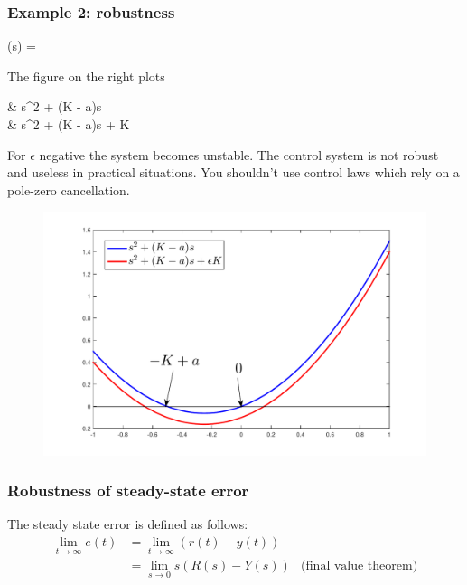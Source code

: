 \begin{frame}
	\frametitle{Example 2: robustness}
	\begin{minipage}{0.5\linewidth}
		\begin{flalign*}
			(s) = 
		\end{flalign*}
		The figure on the right plots
		\begin{flalign*}
			&{\color{blue} s^2 + (K - a)s} \\
			&{\color{red} s^2 + (K - a)s + \epsilon K}
		\end{flalign*}
		For $\epsilon$ negative the system becomes unstable. The control system is not robust and useless in practical situations. You shouldn’t use control laws which rely on a pole-zero cancellation. 
	\end{minipage}
	\begin{minipage}{0.4\linewidth}
		\begin{figure}
			\center
			\includegraphics[width=1.5\linewidth]{robustnessexample}
			\label{fig:robustness-example}
		\end{figure}
	\end{minipage}
\end{frame}


\begin{frame}
	\frametitle{Robustness of steady-state error}
	\begin{definition}
		The steady state error is defined as follows:
		\begin{align*}
			\lim\limits_{t \rightarrow \infty} e(t)
			&= \lim\limits_{t \rightarrow \infty} (r(t) - y(t)) \\
			&= \lim\limits_{s \rightarrow 0} s(R(s) - Y(s)) &\text{(final value theorem)}
		\end{align*}
	\end{definition}
\end{frame}


